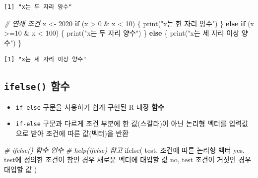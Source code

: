 \documentclass[
  11pt,
]{krantz}
\newenvironment{Shaded}{\begin{snugshade}}{\end{snugshade}}
\newcommand{\CommentTok}[1]{\textcolor[rgb]{0.37,0.37,0.37}{\textit{#1}}}
\newcommand{\ControlFlowTok}[1]{\textcolor[rgb]{0.27,0.27,0.27}{\textbf{#1}}}
\newcommand{\DecValTok}[1]{\textcolor[rgb]{0.06,0.06,0.06}{#1}}
\newcommand{\FunctionTok}[1]{\textcolor[rgb]{0,0,0}{#1}}
\newcommand{\NormalTok}[1]{#1}
\newcommand{\OtherTok}[1]{\textcolor[rgb]{0.37,0.37,0.37}{#1}}
\newcommand{\SpecialCharTok}[1]{\textcolor[rgb]{0,0,0}{#1}}
\newcommand{\StringTok}[1]{\textcolor[rgb]{0.5,0.5,0.5}{#1}}
\providecommand{\tightlist}{%
  \setlength{\itemsep}{0pt}\setlength{\parskip}{0pt}}
\begin{document}
\begin{verbatim}
[1] "x는 두 자리 양수"
\end{verbatim}

\begin{Shaded}
\begin{Highlighting}[]
\CommentTok{\# 연쇄 조건}
\NormalTok{x }\OtherTok{\textless{}{-}} \DecValTok{2020}
\ControlFlowTok{if}\NormalTok{ (x }\SpecialCharTok{\textgreater{}} \DecValTok{0} \SpecialCharTok{\&}\NormalTok{ x }\SpecialCharTok{\textless{}} \DecValTok{10}\NormalTok{) \{}
  \FunctionTok{print}\NormalTok{(}\StringTok{"x는 한 자리 양수"}\NormalTok{)}
\NormalTok{\} }\ControlFlowTok{else} \ControlFlowTok{if}\NormalTok{ (x }\SpecialCharTok{\textgreater{}=}\DecValTok{10} \SpecialCharTok{\&}\NormalTok{ x }\SpecialCharTok{\textless{}} \DecValTok{100}\NormalTok{) \{}
  \FunctionTok{print}\NormalTok{(}\StringTok{"x는 두 자리 양수"}\NormalTok{)}
\NormalTok{\} }\ControlFlowTok{else}\NormalTok{ \{}
  \FunctionTok{print}\NormalTok{(}\StringTok{"x는 세 자리 이상 양수"}\NormalTok{)}
\NormalTok{\}}
\end{Highlighting}
\end{Shaded}

\begin{verbatim}
[1] "x는 세 자리 이상 양수"
\end{verbatim}

\normalsize

\hypertarget{ifelse-fun}{%
\subsection{\texorpdfstring{\textbf{\texttt{ifelse()} 함수}}{ifelse() 함수}}\label{ifelse-fun}}

\begin{itemize}
\tightlist
\item
  \texttt{if-else} 구문을 사용하기 쉽게 구현된 R 내장 \textbf{함수}
\item
  \texttt{if-else} 구문과 다르게 조건 부분에 한 값(스칼라)이 아닌 논리형 벡터를 입력값으로 받아 조건에 따른 값(벡터)을 반환
\end{itemize}

\footnotesize

\begin{Shaded}
\begin{Highlighting}[]
\CommentTok{\# ifelse() 함수 인수}
\CommentTok{\# help(ifelse) 참고}
\FunctionTok{ifelse}\NormalTok{(}
\NormalTok{  test, 조건에 따른 논리형 벡터}
\NormalTok{  yes,  test에 정의한 조건이 참인 경우 새로운 벡터에 대입할 값}
\NormalTok{  no,   test 조건이 거짓인 경우 대입할 값}
\NormalTok{)}
\end{Highlighting}
\end{Shaded}
\end{document}
